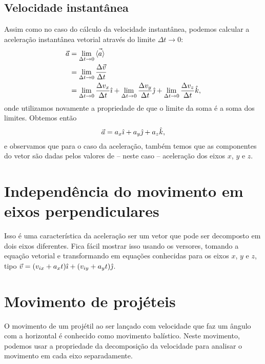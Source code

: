 \subsection{Velocidade instantânea}

Assim como no caso do cálculo da velocidade instantânea, podemos calcular a aceleração instantânea vetorial através do limite $\Delta t \to 0$:
\begin{align}
  \vec{a} &= \lim_{\Delta t \to 0} \vec{\left\langle{a}\right\rangle} \\
  &= \lim_{\Delta t \to 0} \frac{\Delta \vec{v}}{\Delta t} \\
  &= \lim_{\Delta t \to 0} \frac{\Delta {v_x}}{\Delta t}\hat{\imath} + \lim_{\Delta t \to 0} \frac{\Delta {v_y}}{\Delta t}\hat{\jmath} + \lim_{\Delta t \to 0} \frac{\Delta {v_z}}{\Delta t}\hat{k},
\end{align}
%
onde utilizamos novamente a propriedade de que o limite da soma é a soma dos limites. Obtemos então
\begin{equation}
  \vec{a} = a_x \hat{\imath} + a_y \hat{\jmath} + a_z \hat{k},
\end{equation}
%
e observamos que para o caso da aceleração, também temos que as componentes do vetor são dadas pelos valores de -- neste caso -- aceleração dos eixos $x$, $y$ e $z$.

\section{Independência do movimento em eixos perpendiculares}

Isso é uma característica da aceleração ser um vetor que pode ser decomposto em dois eixos diferentes. Fica fácil mostrar isso usando os versores, tomando a equação vetorial e transformando em equações conhecidas para os eixos $x$, $y$ e $z$, tipo $\vec{v} = (v_{ix} + a_x t)\hat{\imath} + (v_{iy} + a_y t)\hat{\jmath}$.

\section{Movimento de projéteis}

O movimento de um projétil ao ser lançado com velocidade que faz um ângulo com a horizontal é conhecido como movimento balístico. Neste movimento, podemos usar a propriedade da decomposição da velocidade para analisar o movimento em cada eixo separadamente.

